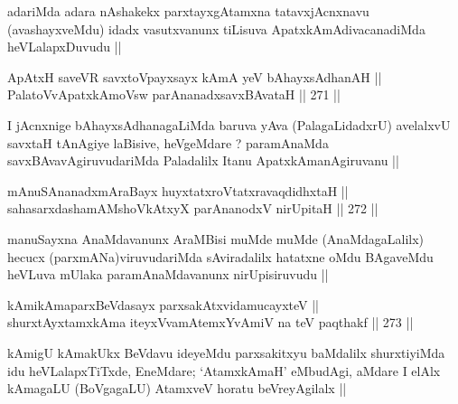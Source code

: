 \begin{artha}
adariMda adara nAshakekx parxtayxgAtamxna tatavxjAcnxnavu
(avashayxveMdu) idadx vasutxvanunx tiLisuva ApatxkAmAdivacanadiMda
heVLalapxDuvudu ||
\end{artha}


\begin{shl}
ApAtxH saveVR savxtoV\s payxsayx kAmA yeV bAhayxsAdhanAH || \\
PalatoV\s vApatxkAmoV\s sw parAnanadxsavxBAvataH ||  271 ||  
\end{shl}

\begin{artha}
I jAcnxnige bAhayxsAdhanagaLiMda baruva yAva (PalagaLidadxrU)
avelalxvU savxtaH tAnAgiye laBisive, heVgeMdare  ? paramAnaMda
savxBAvavAgiruvudariMda Paladalilx Itanu ApatxkAmanAgiruvanu ||
\end{artha}


\begin{shl}
mAnuSAnanadxmAraBayx huyxtatxroVtatxravaqdidhxtaH || \\
sahasarxdashamAMshoVkAtxyX parAnanodxV nirUpitaH ||  272 ||  
\end{shl}

\begin{artha}
manuSayxna AnaMdavanunx AraMBisi muMde muMde (AnaMdagaLalilx) hecucx
(parxmANa)viruvudariMda sAviradalilx hatatxne oMdu BAgaveMdu heVLuva
mUlaka paramAnaMdavanunx nirUpisiruvudu ||
\end{artha}


\begin{shl}
kAmikAmaparxBeVdasayx parxsakAtxvidamucayxteV || \\
shurxtAyx\s \s tamxkAma iteyxVvamAtemxYvAmiV na teV paqthakf ||  273 ||  
\end{shl}

\begin{artha}
kAmigU kAmakUkx BeVdavu ideyeMdu parxsakitxyu baMdalilx shurxtiyiMda
idu heVLalapxTiTxde, EneMdare; `AtamxkAmaH' eMbudAgi, aMdare I elAlx
kAmagaLU (BoVgagaLU) AtamxveV horatu beVreyAgilalx ||
\end{artha}



